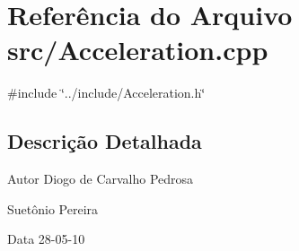 \section{Referência do Arquivo src/Acceleration.cpp}
\label{Acceleration_8cpp}
{\ttfamily \#include \char`\"{}../include/Acceleration.h\char`\"{}}\par


\subsection{Descrição Detalhada}
\begin{DoxyAuthor}{Autor}
Diogo de Carvalho Pedrosa 

Suetônio Pereira 
\end{DoxyAuthor}
\begin{DoxyDate}{Data}
28-\/05-\/10 
\end{DoxyDate}
